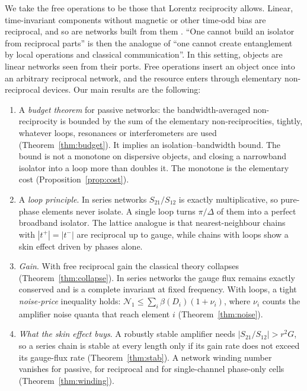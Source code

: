 \documentclass[aps,pra,twocolumn,superscriptaddress,floatfix,nofootinbib]{revtex4-2}
\theoremstyle{definition}
\newcommand{\NN}{\mathcal N_1}
\begin{document}
We take the free operations to be those that Lorentz reciprocity allows. Linear, time-invariant components without magnetic or other time-odd bias are reciprocal, and so are networks built from them \cite{Jal13,Cal18}. ``One cannot build an isolator from reciprocal parts'' is then the analogue of ``one cannot create entanglement by local operations and classical communication''. In this setting, objects are linear networks seen from their ports. Free operations insert an object once into an arbitrary reciprocal network, and the resource enters through elementary non-reciprocal devices. Our main results are the following:
\begin{enumerate}
\item A \emph{budget theorem} for passive networks: the bandwidth-averaged non-reciprocity is bounded by the sum of the elementary non-reciprocities, tightly, whatever loops, resonances or interferometers are used (Theorem~\ref{thm:budget}). It implies an isolation--bandwidth bound. The bound is not a monotone on dispersive objects, and closing a narrowband isolator into a loop more than doubles it. The monotone is the elementary cost (Proposition~\ref{prop:cost}).
\item A \emph{loop principle}. In series networks $S_{21}/S_{12}$ is exactly multiplicative, so pure-phase elements never isolate. A single loop turns $\pi/\Delta$ of them into a perfect broadband isolator. The lattice analogue is that nearest-neighbour chains with $|t^+|=|t^-|$ are reciprocal up to gauge, while chains with loops show a skin effect driven by phases alone.
\item \emph{Gain}. With free reciprocal gain the classical theory collapses (Theorem~\ref{thm:collapse}). In series networks the gauge flux remains exactly conserved and is a complete invariant at fixed frequency. With loops, a tight \emph{noise-price} inequality holds: $\NN\le\sum_i\beta(D_i)(1+\nu_i)$, where $\nu_i$ counts the amplifier noise quanta that reach element $i$ (Theorem~\ref{thm:noise}).
\item \emph{What the skin effect buys}. A robustly stable amplifier needs $|S_{21}/S_{12}|>r^2G$, so a series chain is stable at every length only if its gain rate does not exceed its gauge-flux rate (Theorem~\ref{thm:stab}). A network winding number vanishes for passive, for reciprocal and for single-channel phase-only cells (Theorem~\ref{thm:winding}).
\end{enumerate}
\end{document}
